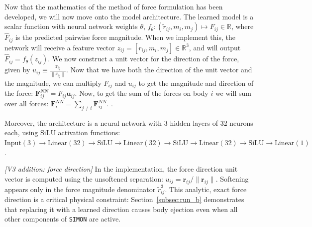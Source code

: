 \documentclass[12pt,a4paper]{article}
\newcommand{\simon}{\texttt{SIMON}}
\begin{document}
Now that the mathematics of the method of force formulation has been developed, we will now move onto the model architecture. The learned model is a scalar function with neural network weights $\theta$, $f_{\theta} : (\tilde{r}_{ij}, m_i, m_j) \mapsto F_{ij} \in \mathbb{R}$, where $\hat{F}_{ij}$ is the predicted pairwise force magnitude. When we implement this, the network will receive a feature vector $z_{ij} = [r_{ij}, m_i, m_j] \in \mathbb{R}^3$, and will output $\hat{F}_{ij} = f_{\theta}(z_{ij})$. We now construct a unit vector for the direction of the force, given by $u_{ij} \equiv \frac{\mathbf{r}_{ij}}{\|\tilde{r_{ij}}\|}$. Now that we have both the direction of the unit vector and the magnitude, we can multiply $\hat{F}_{ij}$ and $u_{ij}$ to get the magnitude and direction of the force: $\mathbf{F}_{ij}^{NN} = F_{ij} \mathbf{u}_{ij}$. Now, to get the sum of the forces on body $i$ we will sum over all forces: $\mathbf{F}_{i}^{NN} = \sum_{j \neq i} \mathbf{F}_{ij}^{NN}$. \cite{kipf2018neural}.

Moreover, the architecture is a neural network with 3 hidden layers of 32 neurons each, using SiLU activation functions:
$\text{Input}(3) \to \text{Linear}(32) \to \text{SiLU} \to \text{Linear}(32) \to \text{SiLU} \to \text{Linear}(32) \to \text{SiLU} \to \text{Linear}(1)$.

\noindent\textit{[V3 addition: force direction]} In the implementation, the force direction unit vector is computed using the unsoftened separation: $u_{ij} = \mathbf{r}_{ij} / \|\mathbf{r}_{ij}\|$. Softening appears only in the force magnitude denominator $\tilde{r}_{ij}^3$. This analytic, exact force direction is a critical physical constraint: Section~\ref{subsec:run_b} demonstrates that replacing it with a learned direction causes body ejection even when all other components of \simon{} are active.
\end{document}
